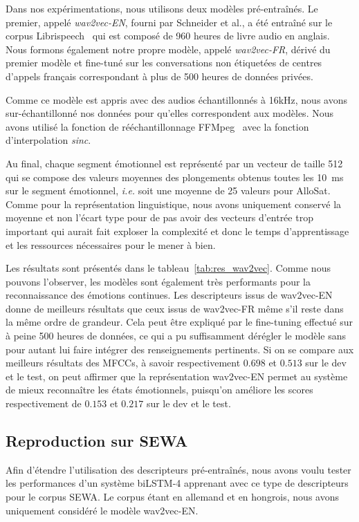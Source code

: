 Dans nos expérimentations, nous utilisons deux modèles pré-entraînés. Le premier, appelé \textit{wav2vec-EN}, fourni par Schneider et al.,  a été entraîné sur le corpus Librispeech~\cite{librispeech} qui est composé de 960 heures de livre audio en anglais.
Nous formons également notre propre modèle, appelé \textit{wav2vec-FR}, dérivé du premier modèle et fine-tuné sur les conversations non étiquetées de centres d'appels français correspondant à plus de 500 heures de données privées.

Comme ce modèle est appris avec des audios échantillonnés à 16kHz, nous avons sur-échantillonné nos données pour qu'elles correspondent aux modèles. Nous avons utilisé la fonction de rééchantillonnage FFMpeg~\cite{Tomar2006} avec la fonction d'interpolation \textit{sinc}.

Au final, chaque segment émotionnel est représenté par un vecteur de taille 512 qui se compose des valeurs moyennes des plongements obtenus toutes les 10~ms sur le segment émotionnel, \textit{i.e.} soit une moyenne de 25 valeurs pour AlloSat. Comme pour la représentation linguistique, nous avons uniquement conservé la moyenne et non l'écart type pour de pas avoir des vecteurs d'entrée trop important qui aurait fait exploser la complexité et donc le temps d'apprentissage et les ressources nécessaires pour le mener à bien.



Les résultats sont présentés dans le tableau~\ref{tab:res_wav2vec}. Comme nous pouvons l'observer, les modèles sont également très performants pour la reconnaissance des émotions continues. Les descripteurs issus de wav2vec-EN donne de meilleurs résultats que ceux issus de wav2vec-FR même s'il reste dans la même ordre de grandeur. Cela peut être expliqué par le fine-tuning effectué sur à peine 500 heures de données, ce qui a pu suffisamment dérégler le modèle sans pour autant lui faire intégrer des renseignements pertinents. Si on se compare aux meilleurs résultats des MFCCs, à savoir respectivement $0.698$ et $0.513$ sur le dev et le test, on peut affirmer que la représentation wav2vec-EN permet au système de mieux reconnaître les états émotionnels, puisqu'on améliore les scores respectivement de $0.153$ et $0.217$ sur le dev et le test.

\subsection{Reproduction sur SEWA}
Afin d'étendre l'utilisation des descripteurs pré-entraînés, nous avons voulu tester les performances d'un système biLSTM-4 apprenant avec ce type de descripteurs pour le corpus SEWA. Le corpus étant en allemand et en hongrois, nous avons uniquement considéré le modèle wav2vec-EN.

